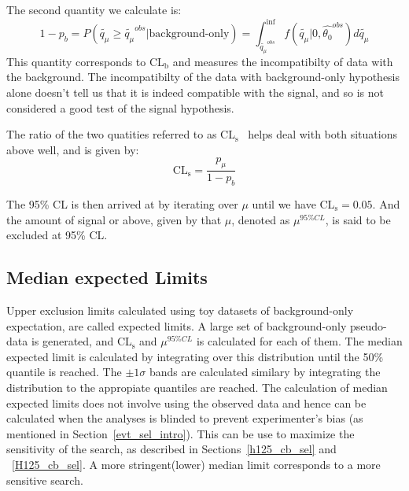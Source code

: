 The second quantity we calculate is:
\begin{equation}                                                                                                                          
  \label{eq:pb}                                                     
  1-p_b=P(\tilde{q_\mu}\geq \tilde{q_\mu}^{obs}|\text{background-only})=\int_{\tilde{q_\mu}^{obs}}^{\inf}f(\tilde{q_\mu}|0,\hat{\theta_0}^{obs})d\tilde{q_\mu}                                                                                                            
\end{equation}
This quantity corresponds to CL$_\text{b}$ and measures the incompatibilty of data with the background. The incompatibilty of the data with background-only hypothesis alone doesn't tell us that it is indeed compatible with the signal, and so is not considered a good test of the signal hypothesis.

The ratio of the two quatities referred to as CL$_\text{s}$~\cite{cls1,cls2,cls3} helps deal with both situations above well, and is given by:
\begin{equation}                                                                                                                          
  \label{eq:cls}                                                                                                                           \text{CL}_\text{s}=\frac{p_\mu}{1-p_b}
\end{equation}

The 95\% CL is then arrived at by iterating over $\mu$ until we have CL$_\text{s}=0.05$. And the amount of signal or above, given by that $\mu$, denoted as $\mu^{95\%CL}$, is said to be excluded at 95\% CL. 

\subsection{Median expected Limits}

Upper exclusion limits calculated using toy datasets of background-only expectation, are called expected limits. A large set of background-only pseudo-data is generated, and CL$_\text{s}$ and $\mu^{95\%CL}$ is calculated for each of them. The median expected limit is calculated by integrating over this distribution until the 50\% quantile is reached. The $\pm 1\sigma$ bands are calculated similary by integrating the distribution to the appropiate quantiles are reached. The calculation of median expected limits does not involve using the observed data and hence can be calculated when the analyses is blinded to prevent experimenter's bias (as mentioned in Section~\ref{evt_sel_intro}). This can be use to maximize the sensitivity of the search, as described in Sections~\ref{h125_cb_sel} and ~\ref{H125_cb_sel}. A more stringent(lower) median limit corresponds to a more sensitive search.  


